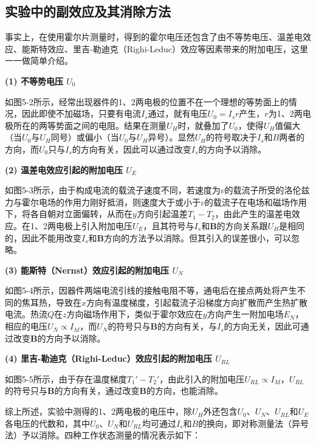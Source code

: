 \subsection{实验中的副效应及其消除方法}

事实上，在使用霍尔片测量时，得到的霍尔电压还包含了由不等势电压、温差电效应、能斯特效应、里吉-勒迪克（Righi-Leduc）效应等因素带来的附加电压，这里一一做简单介绍。

\textbf{(1) 不等势电压 $U_0$}

如图5-2所示，经常出现器件的1、2两电极的位置不在一个理想的等势面上的情况，因此即使不加磁场，只要有电流$I_s$通过，就有电压$U_0 = I_s r$产生，$r$为1、2两电极所在的两等势面之间的电阻。结果在测量$U_H$时，就叠加了$U_0$，使得$U_H$值偏大（当$U_0$与$U_H$同号）或偏小（当$U_0$与$U_H$异号）。显然$U_H$的符号取决于$I_s$和$B$两者的方向，而$U_0$只与$I_s$的方向有关，因此可以通过改变$I_s$的方向予以消除。


\textbf{(2) 温差电效应引起的附加电压 $U_E$}

如图5-3所示，由于构成电流的载流子速度不同，若速度为$v$的载流子所受的洛伦兹力与霍尔电场的作用力刚好抵消，则速度大于或小于$v$的载流子在电场和磁场作用下，将各自朝对立面偏转，从而在$y$方向引起温差$T_1-T_2$，由此产生的温差电效应。在1、2两电极上引入附加电压$U_E$，且其符号与$I_s$和$\mathbf{B}$的方向关系跟$U_H$是相同的，因此不能用改变$I_s$和$\mathbf{B}$方向的方法予以消除。但其引入的误差很小，可以忽略。


\textbf{(3) 能斯特（Nernst）效应引起的附加电压 $U_N$}

如图5-4所示，因器件两端电流引线的接触电阻不等，通电后在接点两处将产生不同的焦耳热，导致在$x$方向有温度梯度，引起载流子沿梯度方向扩散而产生热扩散电流。热流$Q$在$z$方向磁场作用下，类似于霍尔效应在$y$方向产生一附加电场$E_N$，相应的电压$U_N \propto I_M$，而$U_N$的符号只与$\mathbf{B}$的方向有关，与$I_s$的方向无关，因此可通过改变$\mathbf{B}$的方向予以消除。


\textbf{(4) 里吉-勒迪克（Righi-Leduc）效应引起的附加电压 $U_{RL}$}

如图5-5所示，由于存在温度梯度$T_1'-T_2'$，由此引入的附加电压$U_{RL} \propto I_M$，$U_{RL}$的符号只与$\mathbf{B}$的方向有关，通过改变$\mathbf{B}$的方向，也能消除。


综上所述，实验中测得的1、2两电极的电压中，除$U_H$外还包含$U_0$、$U_N$、$U_{RL}$和$U_E$各电压的代数和，其中$U_0$、$U_N$和$U_{RL}$均可通过$I_s$和$B$的换向，即对称测量法（异号法）予以消除。四种工作状态测量的情况表示如下：


